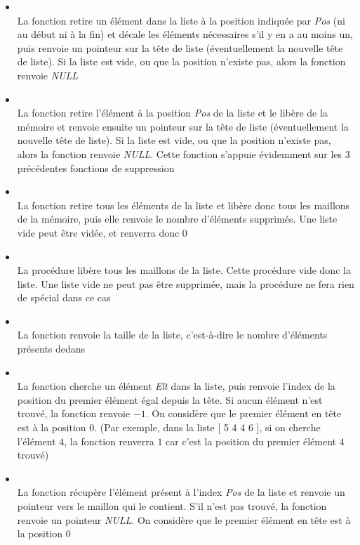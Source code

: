 \documentclass[11pt,a4paper]{article}
\begin{document}
\begin{itemize}
\item {}\\
      La fonction retire un élément dans la liste à la position indiquée par \textit{Pos} (ni au début ni à la fin) et décale les éléments nécessaires s'il y en a au moins un, puis renvoie un pointeur sur la tête de liste (éventuellement la nouvelle tête de liste). Si la liste est vide, ou que la position n'existe pas, alors la fonction renvoie \textit{NULL}
\item {}\\
      La fonction retire l'élément à la position \textit{Pos} de la liste et le libère de la mémoire et renvoie ensuite un pointeur sur la tête de liste (éventuellement la nouvelle tête de liste). Si la liste est vide, ou que la position n'existe pas, alors la fonction renvoie \textit{NULL}. Cette fonction s'appuie évidemment sur les 3 précédentes fonctions de suppression
%
\item {}\\
      La fonction retire tous les éléments de la liste et libère donc tous les maillons de la mémoire, puis elle renvoie le nombre d'éléments supprimés. Une liste vide peut être vidée, et renverra donc $ 0 $
\item {}\\
      La procédure libère tous les maillons de la liste. Cette procédure vide donc la liste. Une liste vide ne peut pas être supprimée, mais la procédure ne fera rien de spécial dans ce cas
%
\item {}\\
      La fonction renvoie la taille de la liste, c'est-à-dire le nombre d'éléments présents dedans
%
\item {}\\
      La fonction cherche un élément \textit{Elt} dans la liste, puis renvoie l'index de la position du premier élément égal depuis la tête. Si aucun élément n'est trouvé, la fonction renvoie $ -1 $. On considère que le premier élément en tête est à la position $ 0 $. (Par exemple, dans la liste [ 5 4 4 6 ], si on cherche l'élément $ 4 $, la fonction renverra $ 1 $ car c'est la position du premier élément $ 4 $ trouvé)
\item {}\\
      La fonction récupère l'élément présent à l'index \textit{Pos} de la liste et renvoie un pointeur vers le maillon qui le contient. S'il n'est pas trouvé, la fonction renvoie un pointeur \textit{NULL}. On considère que le premier élément en tête est à la position $ 0 $
\end{itemize}
\end{document}
